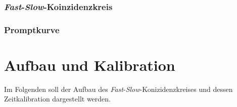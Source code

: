 \documentclass[11pt, a4paper]{article}
\numberwithin{equation}{section}
\begin{document}
\subsubsection{\textit{Fast}-\textit{Slow}-Koinzidenzkreis}

\subsubsection{Promptkurve}

\section{Aufbau und Kalibration}

Im Folgenden soll der Aufbau des \textit{Fast}-\textit{Slow}-Konizidenzkreises und dessen Zeitkalibration dargestellt werden.
\end{document}
